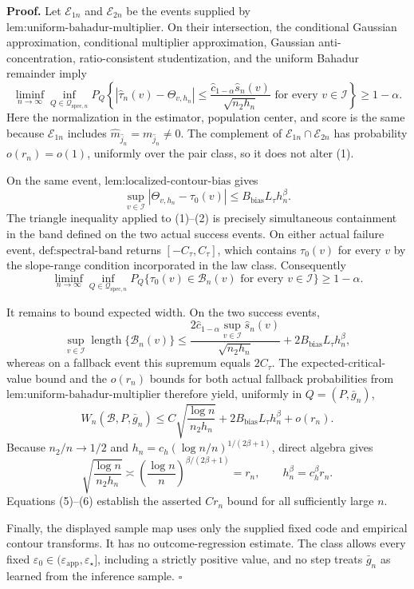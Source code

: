 \textbf{Proof.}
Let \(\mathcal E_{1n}\) and \(\mathcal E_{2n}\) be the events supplied by \(\text{lem:uniform-bahadur-multiplier}\).  On their intersection, the conditional Gaussian approximation, conditional multiplier approximation, Gaussian anti-concentration, ratio-consistent studentization, and the uniform Bahadur remainder imply
\[
 \liminf_{n\to\infty}\inf_{Q\in\mathcal Q_{\mathrm{spec},n}}
 P_Q\left\{
 |\widehat\tau_n(v)-\Theta_{v,h_n}|
 \le \frac{\widehat c_{1-\alpha}\widehat s_n(v)}{\sqrt{n_2h_n}}
 \text{ for every }v\in\mathcal I\right\}\ge 1-\alpha. \tag{1}
\]
Here the normalization in the estimator, population center, and score is the same because \(\mathcal E_{1n}\) includes \(\widehat m_{\widehat j_n}=m_{\widehat j_n}\ne0\).  The complement of \(\mathcal E_{1n}\cap\mathcal E_{2n}\) has probability \(o(r_n)=o(1)\), uniformly over the pair class, so it does not alter (1).

On the same event, \(\text{lem:localized-contour-bias}\) gives
\[
 \sup_{v\in\mathcal I}|\Theta_{v,h_n}-\tau_0(v)|
 \le B_{\mathrm{bias}}L_\tau h_n^\beta. \tag{2}
\]
The triangle inequality applied to (1)--(2) is precisely simultaneous containment in the band defined on the two actual success events.  On either actual failure event, \(\text{def:spectral-band}\) returns \([-C_\tau,C_\tau]\), which contains \(\tau_0(v)\) for every \(v\) by the slope-range condition incorporated in the law class.  Consequently
\[
 \liminf_{n\to\infty}\inf_{Q\in\mathcal Q_{\mathrm{spec},n}}
 P_Q\{\tau_0(v)\in\mathcal B_n(v)\text{ for every }v\in\mathcal I\}
 \ge 1-\alpha. \tag{3}
\]

It remains to bound expected width.  On the two success events,
\[
 \sup_{v\in\mathcal I}\operatorname{length}\{\mathcal B_n(v)\}
 \le
 \frac{2\widehat c_{1-\alpha}\sup_{v\in\mathcal I}\widehat s_n(v)}{\sqrt{n_2h_n}}
 +2B_{\mathrm{bias}}L_\tau h_n^\beta, \tag{4}
\]
whereas on a fallback event this supremum equals \(2C_\tau\).  The expected-critical-value bound and the \(o(r_n)\) bounds for both actual fallback probabilities from \(\text{lem:uniform-bahadur-multiplier}\) therefore yield, uniformly in \(Q=(P,\bar g_n)\),
\[
 W_n(\mathcal B,P,\bar g_n)
 \le C\sqrt{\frac{\log n}{n_2h_n}}
 +2B_{\mathrm{bias}}L_\tau h_n^\beta+o(r_n). \tag{5}
\]
Because \(n_2/n\to1/2\) and \(h_n=c_h(\log n/n)^{1/(2\beta+1)}\), direct algebra gives
\[
 \sqrt{\frac{\log n}{n_2h_n}}\asymp
 \left(\frac{\log n}{n}\right)^{\beta/(2\beta+1)}=r_n,
 \qquad
 h_n^\beta=c_h^\beta r_n. \tag{6}
\]
Equations (5)--(6) establish the asserted \(Cr_n\) bound for all sufficiently large \(n\).

Finally, the displayed sample map uses only the supplied fixed code and empirical contour transforms.  It has no outcome-regression estimate.  The class allows every fixed \(\varepsilon_0\in(\varepsilon_{\mathrm{app}},\varepsilon_\star]\), including a strictly positive value, and no step treats \(\bar g_n\) as learned from the inference sample. \(\square\)